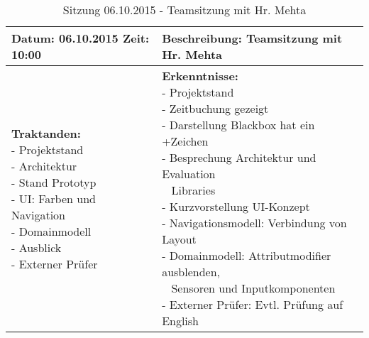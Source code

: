 \begin{table}[H]
\begin{tabularx}{\textwidth}{| l | X |}
\hline
\textbf{Datum:} 06.10.2015
\textbf{Zeit:} 10:00
&
\textbf{Beschreibung:} Teamsitzung mit Hr. Mehta \\ \hline
\specialcell[t]{
\textbf{Traktanden:}\\
- Projektstand\\
- Architektur\\
- Stand Prototyp\\
- UI: Farben und Navigation\\
- Domainmodell\\
- Ausblick\\
- Externer Prüfer\\
}
& 
\specialcell[t]{
\textbf{Erkenntnisse:}\\
- Projektstand\\
- Zeitbuchung gezeigt\\
- Darstellung Blackbox hat ein +Zeichen\\
- Besprechung Architektur und Evaluation\\~ Libraries\\
- Kurzvorstellung UI-Konzept\\
- Navigationsmodell: Verbindung von Layout\\
- Domainmodell: Attributmodifier ausblenden,\\~ Sensoren und Inputkomponenten\\
- Externer Prüfer: Evtl. Prüfung auf English\\
}
\\ \hline
\end{tabularx}
\caption{Sitzung 06.10.2015 - Teamsitzung mit Hr. Mehta}
\end{table}



